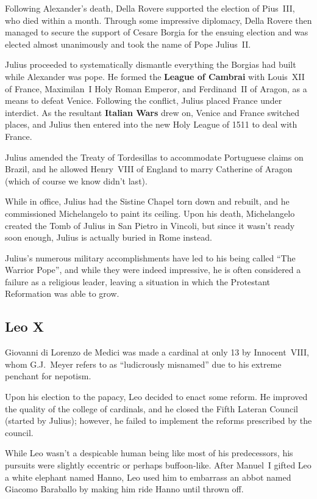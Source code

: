 Following Alexander's death, Della Rovere supported the election of Pius~III, who died within a month.
Through some impressive diplomacy,
Della Rovere then managed to secure the support of Cesare Borgia for the ensuing election
and was elected almost unanimously and took the name of Pope Julius~II\@.

Julius proceeded to systematically dismantle everything the Borgias had built while Alexander was pope.
He formed the \textbf{League of Cambrai}
with Louis~XII of France, Maximilan~I Holy Roman Emperor, and Ferdinand~II of Aragon,
as a means to defeat Venice.
Following the conflict, Julius placed France under interdict.
As the resultant \textbf{Italian Wars} drew on, Venice and France switched places,
and Julius then entered into the new Holy League of 1511 to deal with France.

Julius amended the Treaty of Tordesillas to accommodate Portuguese claims on Brazil,
and he allowed Henry~VIII of England to marry Catherine of Aragon (which of course we know didn't last).

While in office, Julius had the Sistine Chapel torn down and rebuilt,
and he commissioned Michelangelo to paint its ceiling.
Upon his death, Michelangelo created the Tomb of Julius in San Pietro in Vincoli,
but since it wasn't ready soon enough, Julius is actually buried in Rome instead.

Julius's numerous military accomplishments have led to his being called ``The Warrior Pope'',
and while they were indeed impressive, he is often considered a failure as a religious leader,
leaving a situation in which the Protestant Reformation was able to grow.

\subsection*{Leo X}

Giovanni di Lorenzo de Medici was made a cardinal at only 13 by Innocent~VIII,
whom G.J.\ Meyer refers to as ``ludicrously misnamed'' due to his extreme penchant for nepotism.

Upon his election to the papacy, Leo decided to enact some reform.
He improved the quality of the college of cardinals,
and he closed the Fifth Lateran Council (started by Julius);
however, he failed to implement the reforms prescribed by the council.

While Leo wasn't a despicable human being like most of his predecessors,
his pursuits were slightly eccentric or perhaps buffoon-like.
After Manuel~I gifted Leo a white elephant named Hanno,
Leo used him to embarrass an abbot named Giacomo Baraballo by making him ride Hanno until thrown off.

